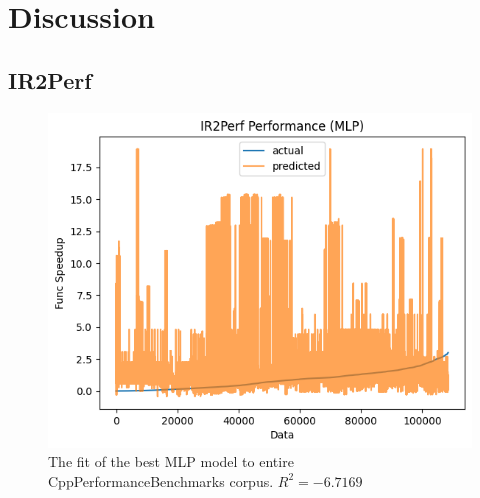\documentclass[nohyperref]{article}
\theoremstyle{plain}
\theoremstyle{definition}
\theoremstyle{remark}
\begin{document}



\section{Discussion}
\label{discussion}
\subsection{IR2Perf}
\begin{figure}[h!]
    \centerline{\includegraphics[width=\columnwidth]{mlp-fit}}
    \caption{The fit of the best MLP model to entire CppPerformanceBenchmarks corpus. $R^2 = -6.7169$}
    \label{fig:mlp-fit}
\end{figure}
\end{document}
